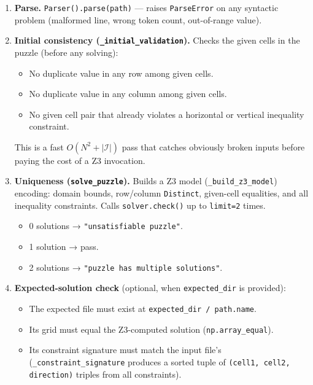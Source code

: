 \begin{enumerate}
  \item \textbf{Parse.}
        \texttt{Parser().parse(path)} — raises \texttt{ParseError} on
        any syntactic problem (malformed line, wrong token count, out-of-range
        value).

  \item \textbf{Initial consistency (\texttt{\_initial\_validation}).}
        Checks the given cells in the puzzle (before any solving):
        \begin{itemize}
          \item No duplicate value in any row among given cells.
          \item No duplicate value in any column among given cells.
          \item No given cell pair that already violates a horizontal or vertical
                inequality constraint.
        \end{itemize}
        This is a fast $O(N^2 + |\mathcal{I}|)$ pass that catches obviously
        broken inputs before paying the cost of a Z3 invocation.

  \item \textbf{Uniqueness (\texttt{solve\_puzzle}).}
        Builds a Z3 model (\texttt{\_build\_z3\_model}) encoding:
        domain bounds, row/column \texttt{Distinct}, given-cell equalities,
        and all inequality constraints.
        Calls \texttt{solver.check()} up to \texttt{limit=2} times.
        \begin{itemize}
          \item 0 solutions → \texttt{"unsatisfiable puzzle"}.
          \item 1 solution → pass.
          \item 2 solutions → \texttt{"puzzle has multiple solutions"}.
        \end{itemize}

  \item \textbf{Expected-solution check} (optional, when \texttt{expected\_dir}
        is provided):
        \begin{itemize}
          \item The expected file must exist at
                \texttt{expected\_dir / path.name}.
          \item Its grid must equal the Z3-computed solution
                (\texttt{np.array\_equal}).
          \item Its constraint signature must match the input file's
                (\texttt{\_constraint\_signature} produces a sorted tuple of
                \texttt{(cell1, cell2, direction)} triples from all constraints).
        \end{itemize}
\end{enumerate}

